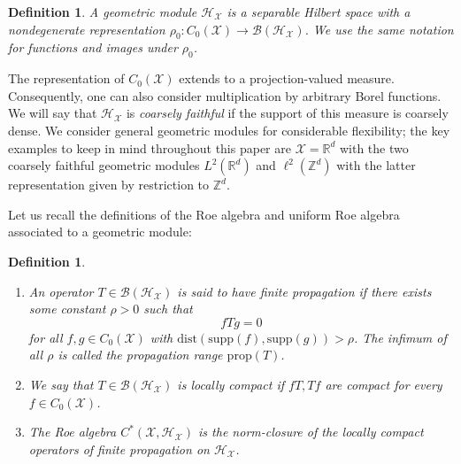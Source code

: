 \documentclass[12pt]{amsart}
\newtheorem{definition}[theorem]{Definition}
\newcommand{\RM}{{\mathbb R}}
\newcommand{\ZM}{{\mathbb Z}}
\newcommand{\Bb}{{\mathcal B}}
\newcommand{\Hh}{{\mathcal H}}
\newcommand{\Xx}{{\mathcal X}}
\begin{document}
\begin{definition}
A geometric module $\Hh_\Xx$ is a separable Hilbert space with a nondegenerate representation $\rho_0: C_0(\Xx) \to \Bb(\Hh_\Xx)$.
We use the same notation for functions and images under $\rho_0$.
\end{definition}
The representation of $C_0(\Xx)$ extends to a projection-valued measure. Consequently, one can also consider multiplication by arbitrary Borel functions. We will say that $\Hh_\Xx$ is \textit{coarsely faithful} if the support of this measure is coarsely dense. We consider general geometric modules for considerable flexibility; the key examples to keep in mind throughout this paper are $\Xx=\RM^d$ with the two coarsely faithful geometric modules $L^2(\RM^d)$ and $\ell^2(\ZM^d)$ with the latter representation given by restriction to $\ZM^d$.

Let us recall the definitions of the Roe algebra and uniform Roe algebra associated to a geometric module:
\begin{definition}
\label{def:roe_algebra}
\leavevmode\newline
\vspace{-0.5cm}
\begin{enumerate}
\item[(i)] 
An operator $T\in \Bb(\Hh_{\Xx})$ is said to have finite propagation if there exists some constant $\rho>0$ such that 
\[f T g =0\]
for all $f,g\in C_0(\Xx)$ with $\mathrm{dist}(\mathrm{supp}(f),\mathrm{supp}(g))> \rho$. The infimum of all $\rho$ is called the propagation range $\mathrm{prop}(T)$.
\item[(ii)] 
We say that  $T\in \Bb(\Hh_{\Xx})$ is locally compact if $f T, T f$ are compact for every $f\in C_0(\Xx)$.
\item[(iii)]
The Roe algebra $C^*(\Xx, \Hh_\Xx)$ is the norm-closure of the locally compact operators of finite propagation on $\Hh_\Xx$.    
\end{enumerate}
\end{definition}
\end{document}
